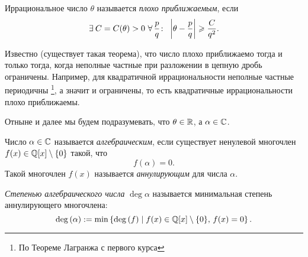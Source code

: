 \begin{ndefinition}
\label{def:III_badly-approximable}
    Иррациональное число $\theta$ называется \emph{плохо приближаемым}, если 
    \[
        \exists C = C(\theta) > 0\ \forall \frac{p}{q}\colon \ \abs{\theta - \frac{p}{q}} \ge \frac{C}{q^2}.
    \]
\end{ndefinition}

\begin{remark}
    Известно (существует такая теорема), что число плохо приближаемо тогда и только тогда, когда неполные частные при разложении в цепную дробь ограничены. Например, для квадратичной иррациональности неполные частные периодичны \footnote{По Теореме Лагранжа с первого курса}, а значит и ограничены, то есть квадратичные иррациональности плохо приближаемы.
\end{remark}

\begin{remark}
    Отныне и далее мы будем подразумевать, что $\theta \in \mathbb{R}$, а $\alpha \in \mathbb{C}$.
\end{remark}

\begin{ndefinition}
\label{def:III_algebraic-number}
    Число $\alpha \in \mathbb{C}$ называется \emph{алгебраическим}, если существует ненулевой многочлен $f(x) \in \mathbb{Q}[x] \setminus \{ 0\}$ такой, что
    \[
        f(\alpha) = 0.
    \]
    Такой многочлен $f(x)$ называется \emph{аннулирующим} для числа $\alpha$.
\end{ndefinition}

\begin{ndefinition}
\label{def:III_algebraic-number-degree}
    \emph{Степенью алгебраического числа} $\deg{\alpha}$ называется минимальная степень аннулирующего многочлена:
    \[
        \operatorname{deg}\left( \alpha \right) := \min\left\{ \operatorname{deg}\left( f \right) \mid f(x) \in \mathbb{Q}[x] \setminus \{ 0 \},\, f(x) = 0 \right\}.
    \]
\end{ndefinition}

